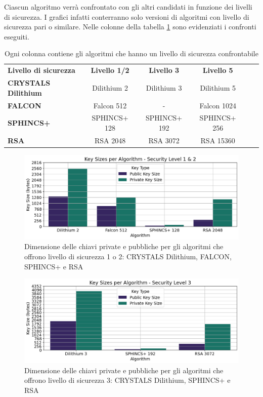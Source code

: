 Ciascun algoritmo verrà confrontato con gli altri candidati in funzione dei livelli di sicurezza. I grafici infatti conterranno solo versioni di algoritmi con livello di sicurezza pari o similare. Nelle colonne della tabella \ref{tab:securitylevels_summary} sono evidenziati i confronti eseguiti.
\begin{table}[H]
    \centering
    \begin{tabular}{lccccc}
        \toprule
        \textbf{Livello di sicurezza} & \textbf{Livello  1/2} & \textbf{Livello 3 } & \textbf{Livello 5} \\
        \cmidrule(lr){1-4}
        \textbf{CRYSTALS Dilithium} & Dilithium 2 & Dilithium 3 & Dilithium 5 \\
        \textbf{FALCON} & Falcon 512 & - & Falcon 1024 \\
        \textbf{SPHINCS+} & SPHINCS+ 128 & SPHINCS+ 192 & SPHINCS+ 256 \\
        \textbf{RSA} & RSA 2048 & RSA 3072 & RSA 15360 \\
        \bottomrule
    \end{tabular}
    \caption{Ogni colonna contiene gli algoritmi che hanno un livello di sicurezza confrontabile}
    \label{tab:securitylevels_summary}
\end{table}


\begin{figure}[H]
    \centering
    \includegraphics[width=1\textwidth]{Immagini/20240822_i9/Key_Sizes/KC_128bit_security_level.png}
    \caption{Dimensione delle chiavi private e pubbliche per gli algoritmi che offrono livello di sicurezza 1 o 2: CRYSTALS Dilithium, FALCON, SPHINCS+ e RSA}
    \label{fig:KC_128bit_security_level}
\end{figure}

\begin{figure}[H]
    \centering
    \includegraphics[width=1\textwidth]{Immagini/20240822_i9/Key_Sizes/KC_192bit_security_level.png}
    \caption{Dimensione delle chiavi private e pubbliche per gli algoritmi che offrono livello di sicurezza 3: CRYSTALS Dilithium, SPHINCS+ e RSA}
    \label{fig:KC_192bit_security_level}
\end{figure}


